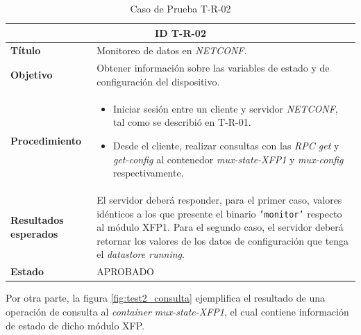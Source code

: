   \begin{table}[H]
    \centering
    \begin{tabular}{ |m{2.5cm}|m{11cm}|  }
    \hline
    \multicolumn{2}{|c|}{ \textbf{ID T-R-02} } \\
    \hline
    \centering
    \textbf{Título} & Monitoreo de datos en \textit{NETCONF}. \\
    \hline
    \centering
    \textbf{Objetivo} & Obtener información sobre las variables de estado y de configuración del dispositivo.  \\
    \hline
    \centering
    \textbf{Procedimiento} & \begin{itemize}
      \item Iniciar sesión entre un cliente y servidor \textit{NETCONF}, tal como se describió en T-R-01.   
      \item Desde el cliente, realizar consultas con las \textit{RPC get} y \textit{get-config} al contenedor \textit{mux-state-XFP1} y \textit{mux-config} respectivamente.
    \end{itemize}     \\

    \hline
    \centering
    \textbf{Resultados esperados} & 
    El servidor deberá responder, para el primer caso, valores idénticos a los que presente el binario \texttt{'monitor'} respecto al módulo XFP1. 
Para el segundo caso, el servidor deberá retornar los valores de los datos de configuración que tenga el \textit{datastore running}.
\\
    
      \hline
    \centering
      \textbf{Estado}    & APROBADO  \\
    \hline
    \end{tabular}
    
    \caption{Caso de Prueba T-R-02}
    \label{tab:TR02}
    \end{table}

  Por otra parte, la figura \ref{fig:test2_consulta} ejemplifica el resultado de una operación de consulta al \textit{container} \textit{mux-state-XFP1}, el cual contiene información de estado de dicho módulo XFP.

